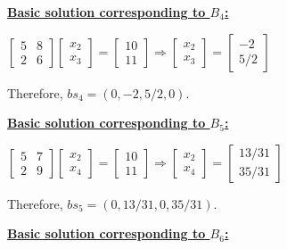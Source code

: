 \documentclass{article}
\begin{document}
\noindent
\textbf{\underline{Basic solution corresponding to $B_4$:}}

\noindent
\newline
$
\begin{bmatrix}
  5 & 8 \\
  2 & 6
\end{bmatrix}
\begin{bmatrix}
  x_2 \\
  x_3
\end{bmatrix}
=
\begin{bmatrix}
 10 \\
 11 
\end{bmatrix}
\Rightarrow
\begin{bmatrix}
  x_2 \\
  x_3
\end{bmatrix}
=
\begin{bmatrix}
  -2 \\
 5/2
\end{bmatrix}
$
\newline

\noindent
Therefore, $bs_4 = (0, -2, 5/2, 0)$.
\newline

\noindent
\textbf{\underline{Basic solution corresponding to $B_5$:}}

\noindent
\newline
$
\begin{bmatrix}
  5 & 7 \\
  2 & 9
\end{bmatrix}
\begin{bmatrix}
  x_2 \\
  x_4
\end{bmatrix}
=
\begin{bmatrix}
 10 \\
 11 
\end{bmatrix}
\Rightarrow
\begin{bmatrix}
  x_2 \\
  x_4
\end{bmatrix}
=
\begin{bmatrix}
  13/31 \\
  35/31
\end{bmatrix}
$
\newline

\noindent
Therefore, $bs_5 = (0, 13/31, 0, 35/31)$.
\newline

\noindent
\textbf{\underline{Basic solution corresponding to $B_6$:}}
\end{document}
